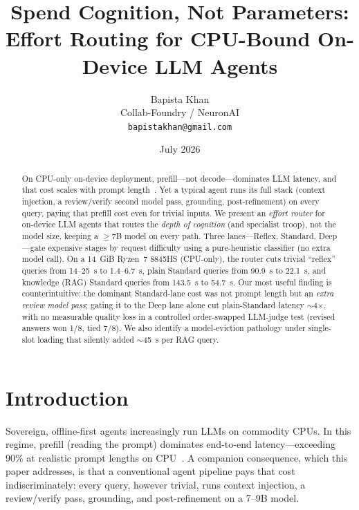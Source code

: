 \documentclass[10pt,twocolumn]{article}
\title{\textbf{Spend Cognition, Not Parameters: Effort Routing for
CPU-Bound On-Device LLM Agents}}
\author{
  Bapista Khan\\
  Collab-Foundry / NeuronAI\\
  \texttt{bapistakhan@gmail.com}
}
\date{July 2026}
\begin{document}
\maketitle

\begin{abstract}
\noindent
On CPU-only on-device deployment, prefill---not decode---dominates LLM
latency, and that cost scales with prompt length~\cite{khan2026prefill}.
Yet a typical agent runs its full stack (context injection, a
review/verify second model pass, grounding, post-refinement) on every
query, paying that prefill cost even for trivial inputs. We present an
\emph{effort router} for on-device LLM agents that routes the \emph{depth
of cognition} (and specialist troop), not the model size, keeping a
$\geq$7B model on every path. Three lanes---Reflex, Standard, Deep---gate
expensive stages by request difficulty using a pure-heuristic classifier
(no extra model call). On a 14~GiB Ryzen~7 8845HS (CPU-only), the router
cuts trivial ``reflex'' queries from 14--25~s to 1.4--6.7~s, plain
Standard queries from 90.9~s to 22.1~s, and knowledge (RAG) Standard
queries from 143.5~s to 54.7~s. Our most useful finding is
counterintuitive: the dominant Standard-lane cost was not prompt length
but an \emph{extra review model pass}; gating it to the Deep lane alone cut
plain-Standard latency $\sim$4$\times$, with no measurable quality loss in a
controlled order-swapped LLM-judge test (revised answers won 1/8, tied
7/8). We also identify a model-eviction
pathology under single-slot loading that silently added $\sim$45~s per RAG
query.
\end{abstract}

\section{Introduction}
\label{sec:intro}

Sovereign, offline-first agents increasingly run LLMs on commodity CPUs.
In this regime, prefill (reading the prompt) dominates end-to-end
latency---exceeding 90\% at realistic prompt lengths on
CPU~\cite{khan2026prefill}. A companion consequence, which this paper
addresses, is that a conventional agent pipeline pays that cost
indiscriminately: every query, however trivial, runs context injection, a
review/verify pass, grounding, and post-refinement on a 7--9B model.
\end{document}
